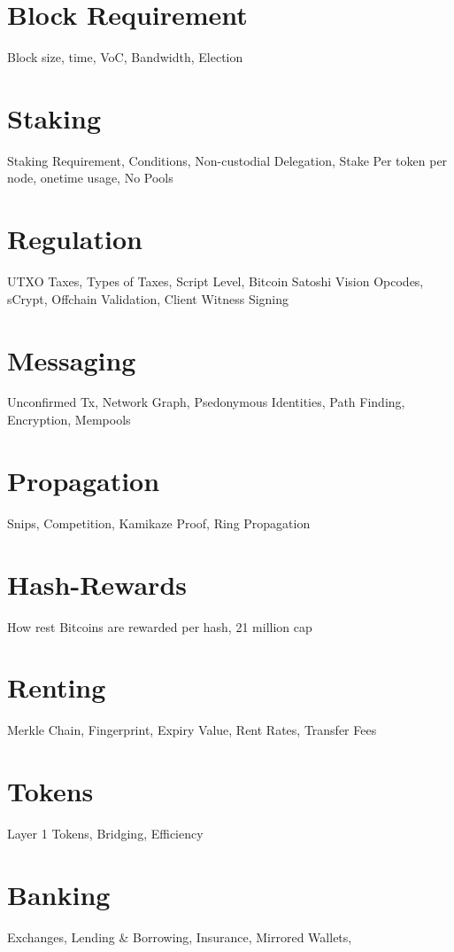 \documentclass[a4paper,11pt]{article}
\begin{document}
\section{Block Requirement}
Block size, time, VoC, Bandwidth, Election

\section{Staking}
Staking Requirement, Conditions, Non-custodial Delegation, Stake Per token per node, onetime usage, No Pools

\section{Regulation}
UTXO Taxes, Types of Taxes, Script Level, Bitcoin Satoshi Vision Opcodes, sCrypt, Offchain Validation, Client Witness Signing

\section{Messaging}
Unconfirmed Tx, Network Graph, Psedonymous Identities, Path Finding, Encryption, Mempools

\section{Propagation}
Snips, Competition, Kamikaze Proof, Ring Propagation

\section{Hash-Rewards}
How rest Bitcoins are rewarded per hash, 21 million cap

\section{Renting}
Merkle Chain, Fingerprint, Expiry Value, Rent Rates, Transfer Fees

\section{Tokens}
Layer 1 Tokens, Bridging, Efficiency

\section{Banking}
Exchanges, Lending \& Borrowing, Insurance, Mirrored Wallets, 
\end{document}
